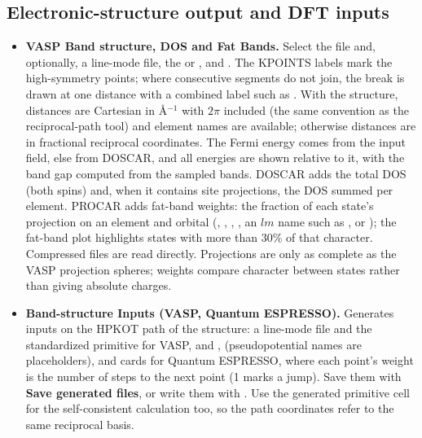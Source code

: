 \subsection{Electronic-structure output and DFT inputs}
\begin{itemize}
\item \textbf{VASP Band structure, DOS and Fat Bands.} Select the  file and, optionally, a line-mode  file, the  or ,  and . The KPOINTS labels mark the high-symmetry points; where consecutive segments do not join, the break is drawn at one distance with a combined label such as . With the structure, distances are Cartesian in \AA$^{-1}$ with $2\pi$ included (the same convention as the reciprocal-path tool) and element names are available; otherwise distances are in fractional reciprocal coordinates. The Fermi energy comes from the input field, else from DOSCAR, and all energies are shown relative to it, with the band gap computed from the sampled bands. DOSCAR adds the total DOS (both spins) and, when it contains site projections, the DOS summed per element. PROCAR adds fat-band weights: the fraction of each state's projection on an element and orbital (, , , , an $lm$ name such as , or ); the fat-band plot highlights states with more than 30\% of that character. Compressed files are read directly. Projections are only as complete as the VASP projection spheres; weights compare character between states rather than giving absolute charges.
\item \textbf{Band-structure Inputs (VASP, Quantum ESPRESSO).} Generates inputs on the HPKOT path of the structure: a line-mode  file and the standardized primitive  for VASP, and ,  (pseudopotential names are placeholders),  and  cards for Quantum ESPRESSO, where each point's weight is the number of steps to the next point (1 marks a jump). Save them with \textbf{Save generated files}, or write them with . Use the generated primitive cell for the self-consistent calculation too, so the path coordinates refer to the same reciprocal basis.
\end{itemize}

